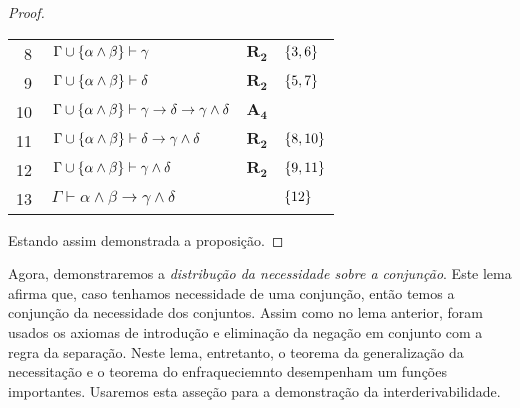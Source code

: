 \begin{tcolorbox}[enhanced jigsaw, breakable, sharp corners, colframe=black, colback=white, boxrule=0.5pt, left=1.5mm, right=1.5mm, top=1.5mm, bottom=1.5mm]
\begin{lemma}
\begin{proof}
\begin{xltabular}{\textwidth}{r | X l l}
            \scriptsize{\phantom{0}8}\phantom{ } & $\ \Gamma\cup\set{\alpha\wedge\beta}\vdash\gamma$                                & $\hyperref[modal.rule.2]{\mathbf{R_2}}$            & $\left\{3,6\right\}$\\[\rowskip]
            \scriptsize{\phantom{0}9}\phantom{ } & $\ \Gamma\cup\set{\alpha\wedge\beta}\vdash\delta$                                & $\hyperref[modal.rule.2]{\mathbf{R_2}}$            & $\left\{5,7\right\}$\\[\rowskip]
            \scriptsize{10}\phantom{ }           & $\ \Gamma\cup\set{\alpha\wedge\beta}\vdash\gamma\to\delta\to\gamma\wedge\delta$  & $\hyperref[modal.axiom.3]{\mathbf{A_4}}$           & \\[\rowskip]
            \scriptsize{11}\phantom{ }           & $\ \Gamma\cup\set{\alpha\wedge\beta}\vdash\delta\to\gamma\wedge\delta$           & $\hyperref[modal.rule.2]{\mathbf{R_2}}$            & $\left\{8,10\right\}$\\[\rowskip]
            \scriptsize{12}\phantom{ }           & $\ \Gamma\cup\set{\alpha\wedge\beta}\vdash\gamma\wedge\delta$                    & $\hyperref[modal.rule.2]{\mathbf{R_2}}$            & $\left\{9,11\right\}$\\[\rowskip]
            \scriptsize{13}\phantom{ }           & $\ \Gamma\vdash\alpha\wedge\beta\to\gamma\wedge\delta$                           &                                & $\left\{12\right\}$
        \end{xltabular}
        \normalsize

        \vspace{0.5\baselineskip}
        Estando assim demonstrada a proposição.
        \end{proof}
    \end{lemma}
\end{tcolorbox}

\vspace{.5\baselineskip}
Agora, demonstraremos a \emph{distribução da necessidade sobre a conjunção}.
Este lema afirma que, caso tenhamos necessidade de uma conjunção, então temos a conjunção da necessidade dos conjuntos.
Assim como no lema anterior, foram usados os axiomas de introdução e eliminação da negação em conjunto com a regra da separação.
Neste lema, entretanto, o teorema da generalização da necessitação e o teorema do enfraqueciemnto desempenham um funções importantes.
Usaremos esta asseção para a demonstração da interderivabilidade.

